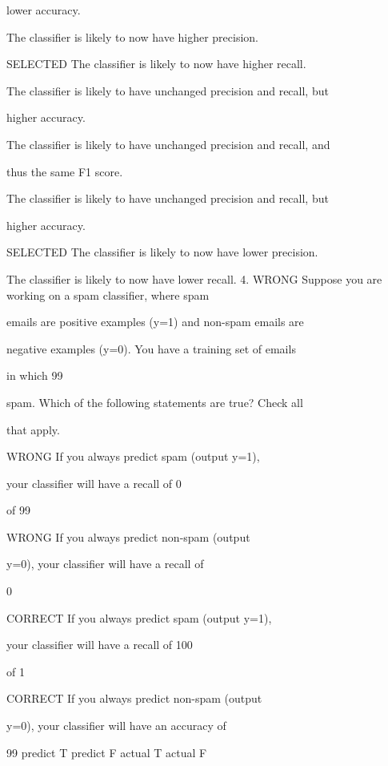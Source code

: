 \documentclass[11pt]{article} %
\begin{document}
lower accuracy.

The classifier is likely to now have higher precision.

SELECTED The classifier is likely to now have higher recall.

The classifier is likely to have unchanged precision and recall, but

higher accuracy.


The classifier is likely to have unchanged precision and recall, and

thus the same F1 score.

The classifier is likely to have unchanged precision and recall, but

higher accuracy.


SELECTED The classifier is likely to now have lower precision.

The classifier is likely to now have lower recall.
4. WRONG
Suppose you are working on a spam classifier, where spam

emails are positive examples (y=1) and non-spam emails are

negative examples (y=0). You have a training set of emails

in which 99%

spam. Which of the following statements are true? Check all

that apply.


WRONG If you always predict spam (output y=1),

your classifier will have a recall of 0%

of 99%


WRONG If you always predict non-spam (output

y=0), your classifier will have a recall of

0%


CORRECT If you always predict spam (output y=1),

your classifier will have a recall of 100%

of 1%



CORRECT If you always predict non-spam (output

y=0), your classifier will have an accuracy of

99%
             predict T	predict F
actual T	
actual F
\end{document}
